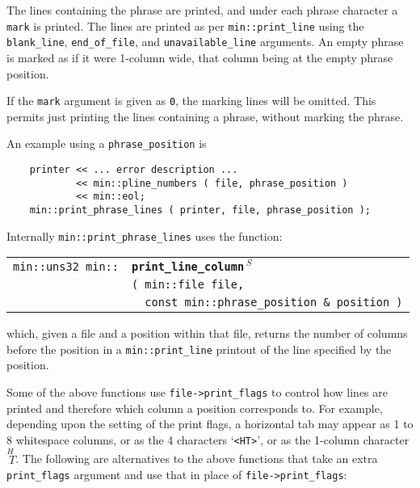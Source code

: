 \documentclass[12pt]{article}
\makeatletter
\newcommand{\ttindex}[1]{\index{#1@{\tt #1}}}
\newcommand{\minindex}[1]{\ttindex{min::#1}\ttindex{#1}}
\newcommand{\EOL}{\penalty \exhyphenpenalty}
\newenvironment{indpar}[1][0.3in]%
	{\begin{list}{}%
		     {\setlength{\itemsep}{0in}%
		      \setlength{\topsep}{0in}%
		      \setlength{\parsep}{1ex}%
		      \setlength{\labelwidth}{#1}%
		      \setlength{\leftmargin}{#1}%
		      \addtolength{\leftmargin}{\labelsep}}%
	 \item}%
	{\end{list}}
\newcommand{\LABEL}[1]{\label{#1}}
\newlength{\ARGBREAKLENGTH}
\newcommand{\ARGBREAK}[1][\ARGBREAKLENGTH]{\\&\hspace*{#1}}
\newcommand{\MINKEY}[1]{{\tt \bf #1}\minindex{#1}}
\newcommand{\RESIZE}{$\,^S$}
\makeatother
\begin{document}
The lines containing the phrase are printed, and under each phrase
character a \verb|mark| is printed.  The lines are printed
as per {\tt min::\EOL print\_\EOL line} using the
{\tt blank\_\EOL line},
{\tt end\_\EOL of\_\EOL file}, and
{\tt unavailable\_\EOL line} arguments.
An empty phrase is marked as if it were 1-column wide, that column
being at the empty phrase position.

If the {\tt mark} argument is given as {\tt 0}, the marking lines
will be omitted.  This permits just printing the lines containing
a phrase, without marking the phrase.

An example using a {\tt phrase\_position} is

\begin{indpar}\begin{verbatim}
    printer << ... error description ...
            << min::pline_numbers ( file, phrase_position )
            << min::eol;
    min::print_phrase_lines ( printer, file, phrase_position );
\end{verbatim}\end{indpar}

Internally {\tt min::\EOL print\_\EOL phrase\_\EOL lines}
uses the function:

\begin{indpar}[1em]\begin{tabular}{r@{}l}
\verb|min::uns32 min::|
    & \MINKEY{print\_\EOL line\_\EOL column\RESIZE}\ARGBREAK
      \verb|( min::file file,|\ARGBREAK
      \verb|  const min::phrase_position & position )|
\LABEL{MIN::PRINT_LINE_COLUMN} \\
\end{tabular}\end{indpar}

which, given a file and a position within that file, returns the number of
columns before the position in a {\tt min::\EOL print\_\EOL line}
printout of the line specified by the position.

Some of the above functions use {\tt file->print\_flags}
to control how lines are printed and therefore which column
a position corresponds to.  For example, depending upon the
setting of the print flags, a horizontal tab may appear as
1 to 8 whitespace columns, or as the 4 characters `{\tt <HT>}',
or as the 1-column character {\tiny $\stackrel{\textstyle H~}{~T}$}.
The following are alternatives to the above functions that take
an extra {\tt print\_\EOL flags} argument and use that in place of
{\tt file->\EOL print\_\EOL flags}:
\end{document}
